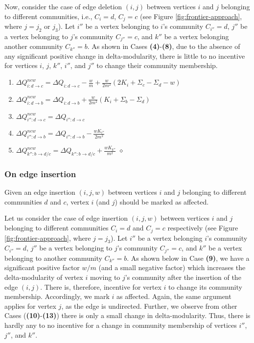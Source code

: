 Now, consider the case of edge deletion $(i, j)$ between vertices $i$ and $j$ belonging to different communities, i.e., $C_i = d$, $C_j = c$ (see Figure \ref{fig:frontier-approach}, where $j = j_2$ or $j_3$). Let $i''$ be a vertex belonging to $i$'s community $C_{i''} = d$, $j''$ be a vertex belonging to $j$'s community $C_{j''} = c$, and $k''$ be a vertex belonging another community $C_{k''} = b$. As shown in Cases \textbf{(4)}-\textbf{(8)}, due to the absence of any significant positive change in delta-modularity, there is little to no incentive for vertices $i$, $j$, $k''$, $i''$, and $j''$ to change their community membership.

\begin{enumerate}[start=4]
  \item $\Delta Q_{i:d \rightarrow c}^{new} = \Delta Q_{i:d \rightarrow c} - \frac{w}{m} + \frac{w}{2m^2} (2K_i + \Sigma_c - \Sigma_d - w)$
  \item $\Delta Q_{i:d \rightarrow b}^{new} = \Delta Q_{i:d \rightarrow b} + \frac{w}{2m^2} (K_i + \Sigma_b - \Sigma_d)$
  \item $\Delta Q_{i'':d \rightarrow c}^{new} = \Delta Q_{i'':d \rightarrow c}$
  \item $\Delta Q_{i'':d \rightarrow b}^{new} = \Delta Q_{i'':d \rightarrow b} - \frac{wK_{i''}}{2m^2}$
  \item $\Delta Q_{k'':b \rightarrow d/c}^{new} = \Delta Q_{k'':b \rightarrow d/c} + \frac{wK_{k''}}{m^2}$ \hfill $\diamond$
\end{enumerate}




\subsubsection{On edge insertion}

\begin{lemma}
\label{thm:louvain--mark-insertion}
Given an edge insertion $(i, j, w)$ between vertices $i$ and $j$ belonging to different communities $d$ and $c$, vertex $i$ (and $j$) should be marked as affected.
\end{lemma}

Let us consider the case of edge insertion $(i, j, w)$ between vertices $i$ and $j$ belonging to different communities $C_i = d$ and $C_j = c$ respectively (see Figure \ref{fig:frontier-approach}, where $j = j_3$). Let $i''$ be a vertex belonging $i$'s community $C_{i''} = d$, $j''$ be a vertex belonging to $j$'s community $C_{j''} = c$, and $k''$ be a vertex belonging to another community $C_{k''} = b$. As shown below in Case \textbf{(9)}, we have a significant positive factor $w/m$ (and a small negative factor) which increases the delta-modularity of vertex $i$ moving to $j$'s community after the insertion of the edge $(i, j)$. There is, therefore, incentive for vertex $i$ to change its community membership. Accordingly, we mark $i$ as affected. Again, the same argument applies for vertex $j$, as the edge is undirected. Further, we observe from other Cases (\textbf{(10)}-\textbf{(13)}) there is only a small change in delta-modularity. Thus, there is hardly any to no incentive for a change in community membership of vertices $i''$, $j''$, and $k''$.

